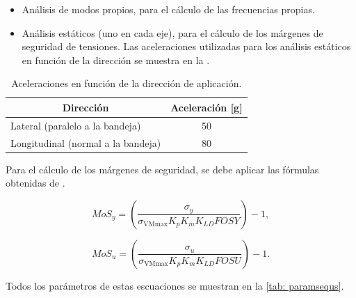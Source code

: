 \begin{itemize}
\item Análisis de modos propios, para el cálculo de las frecuencias propias.
\item Análisis estáticos (uno en cada eje), para el cálculo de los márgenes de seguridad de tensiones. Las aceleraciones utilizadas para los análisis estáticos en función de la dirección se muestra en la .
\end{itemize}

\begin{table}[H]
\centering
\caption{Aceleraciones en función de la dirección de aplicación.}
\label{tab: aceleraciones}      
\begin{tabular}{l c}
\toprule
\multicolumn{1}{c}{\textbf{Dirección}} & \multicolumn{1}{c}{\textbf{Aceleración} [g]}\\ \midrule
 Lateral (paralelo a la bandeja)   & 50   \\
 Longitudinal (normal a la bandeja) & 80 \\ \bottomrule
\end{tabular}
\end{table}

Para el cálculo de los márgenes de seguridad, se debe aplicar las fórmulas obtenidas de \cite{garcia2023manual}.

\begin{equation}
MoS_{y} = \left(\dfrac{\sigma_{y}}{\sigma_{\text{VMmax}} K_{p} K_{m} K_{LD} FOSY}\right)-1,
\end{equation}

\begin{equation}
    MoS_{u} = \left(\dfrac{\sigma_{u}}{\sigma_{\text{VMmax}} K_{p} K_{m} K_{LD} FOSU}\right)-1.
\end{equation}

Todos los parámetros de estas escuaciones se muestran en la \autoref{tab: paramsequs}.


